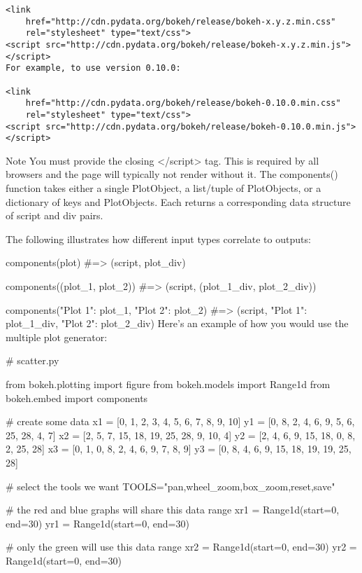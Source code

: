\begin{framed}
	\begin{verbatim}
<link
    href="http://cdn.pydata.org/bokeh/release/bokeh-x.y.z.min.css"
    rel="stylesheet" type="text/css">
<script src="http://cdn.pydata.org/bokeh/release/bokeh-x.y.z.min.js"></script>
For example, to use version 0.10.0:

<link
    href="http://cdn.pydata.org/bokeh/release/bokeh-0.10.0.min.css"
    rel="stylesheet" type="text/css">
<script src="http://cdn.pydata.org/bokeh/release/bokeh-0.10.0.min.js"></script>
\end{verbatim}
\end{framed}
Note
You must provide the closing </script> tag. This is required by all browsers and the page will typically not render without it.
The components() function takes either a single PlotObject, a list/tuple of PlotObjects, or a dictionary of keys and PlotObjects. Each returns a corresponding data structure of script and div pairs.

The following illustrates how different input types correlate to outputs:

components(plot)
#=> (script, plot_div)

components((plot_1, plot_2))
#=> (script, (plot_1_div, plot_2_div))

components({"Plot 1": plot_1, "Plot 2": plot_2})
#=> (script, {"Plot 1": plot_1_div, "Plot 2": plot_2_div})
Here’s an example of how you would use the multiple plot generator:

# scatter.py

from bokeh.plotting import figure
from bokeh.models import Range1d
from bokeh.embed import components

# create some data
x1 = [0, 1, 2, 3, 4, 5, 6, 7, 8, 9, 10]
y1 = [0, 8, 2, 4, 6, 9, 5, 6, 25, 28, 4, 7]
x2 = [2, 5, 7, 15, 18, 19, 25, 28, 9, 10, 4]
y2 = [2, 4, 6, 9, 15, 18, 0, 8, 2, 25, 28]
x3 = [0, 1, 0, 8, 2, 4, 6, 9, 7, 8, 9]
y3 = [0, 8, 4, 6, 9, 15, 18, 19, 19, 25, 28]

# select the tools we want
TOOLS="pan,wheel_zoom,box_zoom,reset,save"

# the red and blue graphs will share this data range
xr1 = Range1d(start=0, end=30)
yr1 = Range1d(start=0, end=30)

# only the green will use this data range
xr2 = Range1d(start=0, end=30)
yr2 = Range1d(start=0, end=30)

